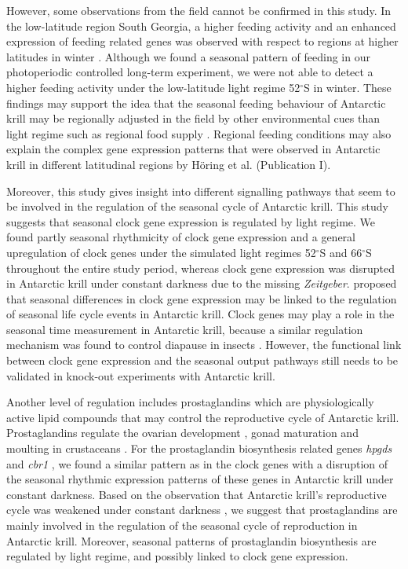 However, some observations from the field cannot be confirmed in this study. In
the low-latitude region South Georgia, a higher feeding activity and an
enhanced expression of feeding related genes was observed with respect to
regions at higher latitudes in winter \citep{schmidt_feeding_2014,
seear_seasonal_2012}. Although we found a seasonal pattern of feeding in our
photoperiodic controlled long-term experiment, we were not able to detect a
higher feeding activity under the low-latitude light regime 52$^{\circ}$S in
winter. These findings may support the idea that the seasonal feeding behaviour
of Antarctic krill may be regionally adjusted in the field by other
environmental cues than light regime such as regional food supply
\citep{schmidt_feeding_2014}. Regional feeding conditions may also explain the
complex gene expression patterns that were observed in Antarctic krill in
different latitudinal regions by Höring et al. (Publication I).

Moreover, this study gives insight into different signalling pathways that seem
to be involved in the regulation of the seasonal cycle of Antarctic krill. This
study suggests that seasonal clock gene expression is regulated by light
regime. We found partly seasonal rhythmicity of clock gene expression and a
general upregulation of clock genes under the simulated light regimes
52$^{\circ}$S and 66$^{\circ}$S throughout the entire study period, whereas clock
gene expression was disrupted in Antarctic krill under constant darkness due to
the missing \textit{Zeitgeber}. \citep{piccolin_seasonal_2018} proposed that
seasonal differences in clock gene expression may be linked to the regulation
of seasonal life cycle events in Antarctic krill. Clock genes may play a role
in the seasonal time measurement in Antarctic krill, because a similar
regulation mechanism was found to control diapause in insects
\citep{meuti_functional_2015}.  However, the functional link between clock gene
expression and the seasonal output pathways still needs to be validated in
knock-out experiments with Antarctic krill.

Another level of regulation includes prostaglandins which are physiologically
active lipid compounds that may control the reproductive cycle of Antarctic
krill. Prostaglandins regulate the ovarian development
\citep{wimuttisuk_insights_2013}, gonad maturation and moulting in crustaceans
\citep{nagaraju_reproductive_2011}. For the prostaglandin biosynthesis related
genes \textit{hpgds} and \textit{cbr1} \citep{wimuttisuk_insights_2013}, we
found a similar pattern as in the clock genes with a disruption of the seasonal
rhythmic expression patterns of these genes in Antarctic krill under constant
darkness. Based on the observation that Antarctic krill's reproductive cycle
was weakened under constant darkness \citep{horing_light_2018}, we suggest that
prostaglandins are mainly involved in the regulation of the seasonal cycle of
reproduction in Antarctic krill. Moreover, seasonal patterns of prostaglandin
biosynthesis are regulated by light regime, and possibly linked to clock gene
expression.

